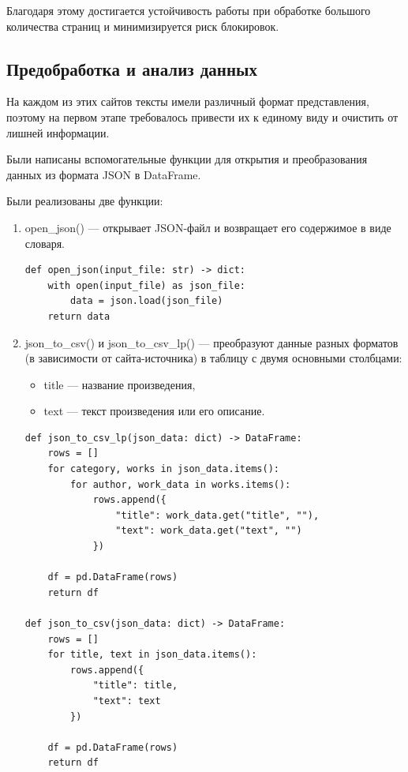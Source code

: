 \documentclass[coursework]{SCWorks}
\begin{document}
    Благодаря этому достигается устойчивость работы при обработке большого количества страниц и минимизируется риск блокировок.

    \subsection{Предобработка и анализ данных}

    На каждом из этих сайтов тексты имели различный формат представления, поэтому на первом этапе требовалось привести их
    к единому виду и очистить от лишней информации.


    Были написаны вспомогательные функции для открытия и преобразования данных из формата JSON в DataFrame.

    Были реализованы две функции:
    \begin{enumerate}
        \item open\_json() — открывает JSON-файл и возвращает его содержимое в виде словаря.
        \begin{verbatim}
def open_json(input_file: str) -> dict:
    with open(input_file) as json_file:
        data = json.load(json_file)
    return data
        \end{verbatim}
        \item json\_to\_csv() и json\_to\_csv\_lp() — преобразуют данные разных форматов (в зависимости от сайта-источника)
        в таблицу с двумя основными столбцами:

        \begin{itemize}
            \item title — название произведения,
            \item text — текст произведения или его описание.
        \end{itemize}
        \begin{verbatim}
def json_to_csv_lp(json_data: dict) -> DataFrame:
    rows = []
    for category, works in json_data.items():
        for author, work_data in works.items():
            rows.append({
                "title": work_data.get("title", ""),
                "text": work_data.get("text", "")
            })

    df = pd.DataFrame(rows)
    return df

def json_to_csv(json_data: dict) -> DataFrame:
    rows = []
    for title, text in json_data.items():
        rows.append({
            "title": title,
            "text": text
        })

    df = pd.DataFrame(rows)
    return df
        \end{verbatim}
    \end{enumerate}
\end{document}
